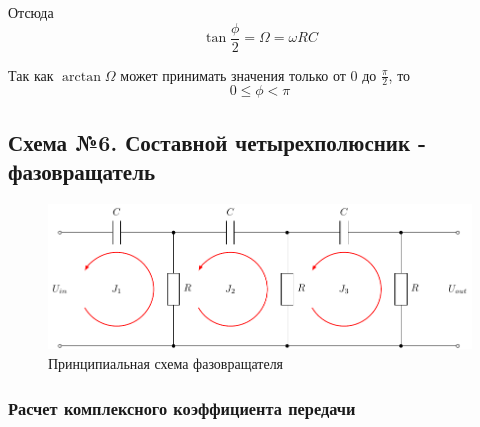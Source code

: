 Отсюда
\begin{equation}
	\tan\frac{\phi}{2}=\Omega = \omega RC
\end{equation}

Так как $\arctan\Omega$ может принимать значения только от 0 до $\frac{\pi}2$, то 
\begin{equation}
	0\leq\phi<\pi
\end{equation}

\subsection{Схема №6. Составной четырехполюсник - фазовращатель}

\begin{figure}[H]
	\centering
	\includegraphics[]{chems/chem6}
	\caption{Принципиальная схема фазовращателя}
	\label{fig:ph_rot2}
\end{figure}

\subsubsection{Расчет комплексного коэффициента передачи}

